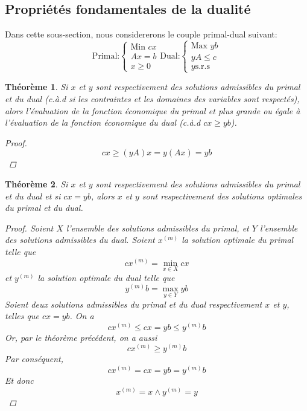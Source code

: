 \documentclass[a4paper]{report}
\theoremstyle{definition}
\theoremstyle{remark}
\theoremstyle{plain}
\newtheorem{theorem}{Théorème}
\begin{document}
\subsection{Propriétés fondamentales de la dualité}
Dans cette sous-section, nous considererons le couple primal-dual suivant:
\[\text{Primal:}
\begin{cases}
	\text{Min } cx \\
	Ax=b \\
	x \ge 0
\end{cases}
\text{Dual:}\begin{cases}
\text{Max } yb\\
yA\le c\\
y\text{s.r.s}
\end{cases}\]

\begin{theorem}
Si \(x\) et \(y\) sont respectivement des solutions admissibles du primal et du
dual (c.à.d si les contraintes et les domaines des variables sont respectés),
alors l'évaluation de la fonction économique du primal et plus grande ou
égale à l'évaluation de la fonction économique du dual (c.à.d \(cx\ge yb\)).
\begin{proof}
\[cx\ge (yA)x=y(Ax)=yb\]
\end{proof}
\end{theorem}

\begin{theorem}
Si \(x\) et \(y\) sont respectivement des solutions admissibles du primal et du
dual et si \(cx=yb\), alors \(x\) et \(y\) sont respectivement des solutions
optimales du primal et du dual.
\begin{proof}
Soient \(X\) l'ensemble des solutions admissibles du primal, et \(Y\) l'ensemble
des solutions admissibles du dual. Soient \(x^{(m)}\) la solution optimale du
primal telle que
\[cx^{(m)}=\min_{x\in X}cx\]
et \(y^{(m)}\) la solution optimale du dual telle que
\[y^{(m)}b=\max_{y\in Y}yb\]
Soient deux solutions admissibles du primal et du dual respectivement \(x\) et
\(y\), telles que \(cx=yb\). On a
\[cx^{(m)}\le cx=yb\le y^{(m)}b\]
Or, par le théorème précédent, on a aussi
\[cx^{(m)}\ge y^{(m)}b\]
Par conséquent,
\[cx^{(m)}=cx=yb=y^{(m)}b\]
Et donc
\[x^{(m)}=x\land y^{(m)}=y\]
\end{proof}
\end{theorem}
\end{document}
